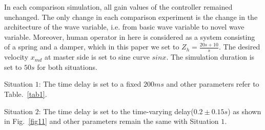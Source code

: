 \par In each comparison simulation,
all gain values of the controller remained unchanged.
The only change in each comparison experiment is the change in the architecture of the wave variable,
i.e. from basic wave variable to novel wave variable.
Moreover,
human operator in here is considered as a system consisting of a spring and a damper, 
which in this paper we set to $Z_h=\frac{20s+10}{s}$.
The desired velocity $x_{md}$ at master side is set to sine curve $sinx$.
The simulation duration is set to $50s$ for both situations.

\par Situation $1$: The time delay is set to a fixed $200ms$
and other parameters refer to Table.~\ref{tab1}.

\par Situation $2$: The time delay is set to the time-varying delay($0.2\pm 0.15s$)
as shown in Fig.~\ref{fig11}
and other parameters remain the same with Situation $1$.


